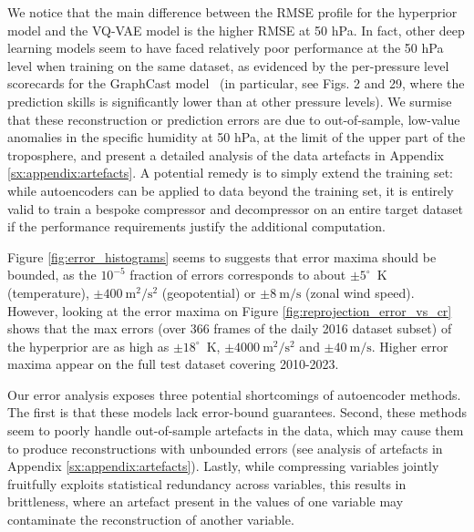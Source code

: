 We notice that the main difference between the RMSE profile for the hyperprior model and the VQ-VAE model is the higher RMSE at 50 hPa. In fact, other deep learning models seem to have faced relatively poor performance at the 50 hPa level when training on the same dataset, as evidenced by the per-pressure level scorecards for the GraphCast model~\citep{lam2023graphcast} (in particular, see Figs. 2 and 29, where the prediction skills is significantly lower than at other pressure levels). We surmise that these reconstruction or prediction errors are due to out-of-sample, low-value anomalies in the specific humidity at 50 hPa, at the limit of the upper part of the troposphere, and present a detailed analysis of the data artefacts in Appendix \ref{sx:appendix:artefacts}.
A potential remedy is to simply extend the training set: while autoencoders can be applied to data beyond the training set, it is entirely valid to train a bespoke compressor and decompressor on an entire target dataset if the performance requirements justify the additional computation.

Figure \ref{fig:error_histograms} seems to suggests that error maxima should be bounded, as the $10^{-5}$ fraction of errors 
corresponds to about $\pm 5^\circ$~K (temperature), $\pm 400~\text{m}^2/\text{s}^2$ (geopotential) or $\pm 8~\text{m}/\text{s}$ (zonal wind speed). However, looking at the error maxima on Figure \ref{fig:reprojection_error_vs_cr} shows that the max errors (over 366 frames of the daily 2016 dataset subset) of the hyperprior are as high as $\pm 18^\circ$~K, $\pm 4000~\text{m}^2/\text{s}^2$ and $\pm 40~\text{m}/\text{s}$. Higher error maxima appear on the full test dataset covering 2010-2023.

Our error analysis exposes three potential shortcomings of autoencoder methods. The first is that these models lack error-bound guarantees.
Second, these methods seem to poorly handle out-of-sample artefacts in the data, which may cause them to produce reconstructions with unbounded errors (see analysis of artefacts in Appendix \ref{sx:appendix:artefacts}). Lastly, while compressing variables jointly fruitfully exploits statistical redundancy across variables, this results in brittleness, where an artefact present in the values of one variable may contaminate the reconstruction of another variable.



